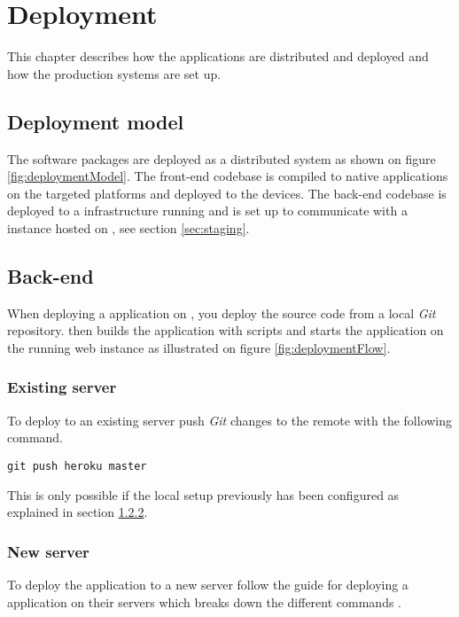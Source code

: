 \chapter{Deployment}
This chapter describes how the applications are distributed and deployed and how the production systems are set up.

\section{Deployment model}
The software packages are deployed as a distributed system as shown on figure \ref{fig:deploymentModel}.
The front-end codebase is compiled to native applications on the targeted platforms and deployed to the devices.
The back-end codebase is deployed to a  infrastructure running  and is set up to communicate with a  instance hosted on , see section \ref{sec:staging}.


\section{Back-end}
When deploying a  application on , you deploy the source code from a local \textit{Git} repository.
 then builds the application with  scripts and starts the application on the running web instance as illustrated on figure \ref{fig:deploymentFlow}.


\subsection{Existing server}
To deploy to an existing server push \textit{Git} changes to the  remote with the following command.

\verb+git push heroku master+

This is only possible if the local setup previously has been configured as explained in section \ref{sec:deployment:new}.

\subsection{New server}
\label{sec:deployment:new}
To deploy the application to a new server follow the  guide for deploying a  application on their servers which breaks down the different commands \citep{documentation:deployment:heroku}.

